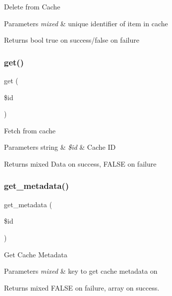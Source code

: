 Delete from Cache


\begin{DoxyParams}{Parameters}
{\em mixed} & unique identifier of item in cache \\
\hline
\end{DoxyParams}
\begin{DoxyReturn}{Returns}
bool true on success/false on failure 
\end{DoxyReturn}
\mbox{\label{class_c_i___cache__file_a50e3bfb586b2f42932a6a93f3fbb0828}} 
\subsubsection{\texorpdfstring{get()}{get()}}
{\footnotesize\ttfamily get (\begin{DoxyParamCaption}\item[{}]{\$id }\end{DoxyParamCaption})}

Fetch from cache


\begin{DoxyParams}[1]{Parameters}
string & {\em \$id} & Cache ID \\
\hline
\end{DoxyParams}
\begin{DoxyReturn}{Returns}
mixed Data on success, F\+A\+L\+SE on failure 
\end{DoxyReturn}
\mbox{\label{class_c_i___cache__file_a59635cf18e997c5141bffa05ff7622e0}} 
\subsubsection{\texorpdfstring{get\+\_\+metadata()}{get\_metadata()}}
{\footnotesize\ttfamily get\+\_\+metadata (\begin{DoxyParamCaption}\item[{}]{\$id }\end{DoxyParamCaption})}

Get Cache Metadata


\begin{DoxyParams}{Parameters}
{\em mixed} & key to get cache metadata on \\
\hline
\end{DoxyParams}
\begin{DoxyReturn}{Returns}
mixed F\+A\+L\+SE on failure, array on success. 
\end{DoxyReturn}
\mbox{\label{class_c_i___cache__file_a2f07a4e09b57f4460d49852497d1808f}} 
